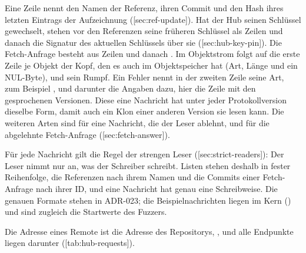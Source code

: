 Eine Zeile  nennt den Namen der Referenz, ihren Commit und den Hash ihres letzten
Eintrags der Aufzeichnung ([sec:ref-update]).
Hat der Hub seinen Schlüssel gewechselt, stehen vor den Referenzen seine früheren Schlüssel als
Zeilen  und danach die Signatur des aktuellen Schlüssels über sie
([sec:hub-key-pin]).
Die Fetch-Anfrage besteht aus Zeilen  und danach .
Im Objektstrom folgt auf die erste Zeile je Objekt der Kopf, den es auch im Objektspeicher hat
(Art, Länge und ein NUL-Byte), und sein Rumpf.
Ein Fehler nennt in der zweiten Zeile seine Art, zum Beispiel ,
und darunter die Angaben dazu, hier die Zeile  mit den gesprochenen Versionen.
Diese eine Nachricht hat unter jeder Protokollversion dieselbe Form, damit auch ein Klon einer
anderen Version sie lesen kann.
Die weiteren Arten sind  für eine Nachricht, die der Leser ablehnt, und
 für die abgelehnte Fetch-Anfrage ([sec:fetch-answer]).

Für jede Nachricht gilt die Regel der strengen Leser ([sec:strict-readers]):
Der Leser nimmt nur an, was der Schreiber schreibt.
Listen stehen deshalb in fester Reihenfolge, die Referenzen nach ihrem Namen und die Commits einer
Fetch-Anfrage nach ihrer ID, und eine Nachricht hat genau eine Schreibweise.
Die genauen Formate stehen in ADR-023; die Beispielnachrichten liegen im Kern
() und sind zugleich die Startwerte des Fuzzers.

Die Adresse eines Remote ist die Adresse des Repositorys,
, und alle Endpunkte liegen darunter
([tab:hub-requests]).

